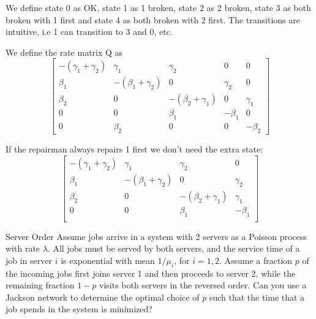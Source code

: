 \begin{solution}
  We define state 0 as OK, state 1 as 1 broken, state 2 as 2 broken, state 3 as both broken with 1 first and state 4 as both broken with 2 first. The transitions are intuitive, i.e 1 can transition to 3 and 0, etc.

  We define the rate matrix Q as
  \[
  \begin{bmatrix}
    -(\gamma_1 + \gamma_2)& \gamma_1 & \gamma_2 & 0 & 0 \\
    \beta_1 & -(\beta_1 + \gamma_2) & 0 & \gamma_2 & 0 \\
    \beta_2 & 0 & -(\beta_2 + \gamma_1) & 0 & \gamma_1 \\
    0 & 0 & \beta_1 & -\beta_1 & 0 \\
    0 & \beta_2 & 0 & 0 & -\beta_2
  \end{bmatrix}
  \]

  If the repairman always repairs 1 first we don't need the extra state:
  \[
  \begin{bmatrix}
    -(\gamma_1 + \gamma_2)& \gamma_1 & \gamma_2 & 0 \\
    \beta_1 & -(\beta_1 + \gamma_2) & 0 & \gamma_2 \\
    \beta_2 & 0 & -(\beta_2 + \gamma_1) & \gamma_1 \\
    0 & 0 & \beta_1 & -\beta_1  \\
  \end{bmatrix}
  \]

\end{solution}


\begin{problem}{Server Order}
Assume jobs arrive in a system with 2 servers as a Poisson process with rate \( \lambda \). All jobs must be served by both servers, and the service time of a job in server \( i \) is exponential with mean \( 1/\mu_i \), for \( i = 1, 2 \). Assume a fraction \( p \) of the incoming jobs first joins server 1 and then proceeds to server 2, while the remaining fraction \( 1 - p \) visits both servers in the reversed order. Can you use a Jackson network to determine the optimal choice of \( p \) such that the time that a job spends in the system is minimized?
\end{problem}

